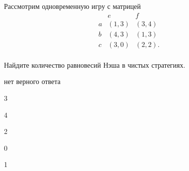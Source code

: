 
\begin{question}
Рассмотрим одновременную игру с матрицей
\[
\begin{matrix}
   & e & f \\
a  & (1, 3) & (3, 4) \\
b  & (4, 3) & (1, 3) \\
c  & (3, 0)          & (2, 2). \\
\end{matrix}
\]

Найдите количество равновесий Нэша в чистых стратегиях.
\begin{answerlist}
  \item нет верного ответа
  \item 3
  \item 4
  \item 2
  \item 0
  \item 1
\end{answerlist}
\end{question}


